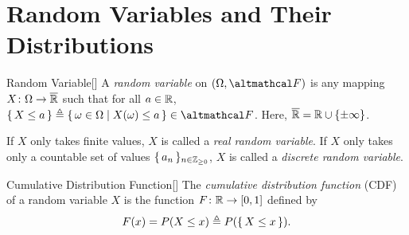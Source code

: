 \documentclass[../complex_variables_1.tex]{subfiles}
\begin{document}
\section{Random Variables and Their Distributions}

\begin{Definition}{Random Variable}[]
    A \emph{random variable} on \((\Omega, \mcal{F})\) is any mapping \(X \colon \Omega \to \ol{\RR}\)
    such that for all \(a \in \RR\), \(\{\,X \le a\,\} \triangleq \{\,\omega \in \Omega \mid
    X(\omega) \le a\,\} \in \mcal{F}\). Here, \(\ol{\RR} = \RR \cup \{\pm\infty\}\).

    \begin{itemize}
        \ii
        If \(X\) only takes finite values, \(X\) is called a
        \emph{real random variable}.
        \ii
        If \(X\) only takes only a countable set of values \(\{\,a_n\,\}_{n \in \ZZ_{\ge 0}}\),
        \(X\) is called a \emph{discrete random variable}.
    \end{itemize}
\end{Definition}

\begin{Definition}{Cumulative Distribution Function}[]
    The \emph{cumulative distribution function} (CDF) of a random variable \(X\) is the function
    \(F \colon \RR \to [0, 1]\) defined by
    \[
        F(x) = P(X \le x) \triangleq P(\{\,X \le x\,\})\text.
    \]
\end{Definition}
\end{document}
